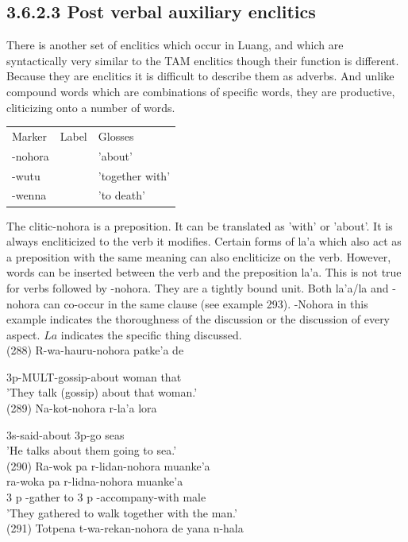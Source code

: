 \documentclass[10pt]{article}
\begin{document}
\subsection*{3.6.2.3 Post verbal auxiliary enclitics}
There is another set of enclitics which occur in Luang, and which are syntactically very similar to the TAM enclitics though their function is different. Because they are enclitics it is difficult to describe them as adverbs. And unlike compound words which are combinations of specific words, they are productive, cliticizing onto a number of words.

\begin{center}
\begin{tabular}{lll}
Marker & Label & Glosses \\
-nohora &  & 'about' \\
-wutu &  & 'together with' \\
-wenna &  & 'to death' \\
\end{tabular}
\end{center}

The clitic-nohora is a preposition. It can be translated as 'with' or 'about'. It is always encliticized to the verb it modifies. Certain forms of la'a which also act as a preposition with the same meaning can also encliticize on the verb. However, words can be inserted between the verb and the preposition la'a. This is not true for verbs followed by -nohora. They are a tightly bound unit. Both la'a/la and -nohora can co-occur in the same clause (see example 293). -Nohora in this example indicates the thoroughness of the discussion or the discussion of every aspect. \(L a\) indicates the specific thing discussed.\\
(288) R-wa-hauru-nohora patke'a de

3p-MULT-gossip-about woman that\\
'They talk (gossip) about that woman.'\\
(289) Na-kot-nohora r-la'a lora

3s-said-about 3p-go seas\\
'He talks about them going to sea.'\\
(290) Ra-wok pa r-lidan-nohora muanke'a\\
ra-woka pa r-lidna-nohora muanke'a\\
3 p -gather to 3 p -accompany-with male\\
'They gathered to walk together with the man.'\\
(291) Totpena t-wa-rekan-nohora de yana n-hala
\end{document}
